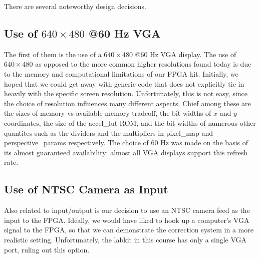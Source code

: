 \documentclass{article}
\begin{document}
There are several noteworthy design decisions.

\subsection{Use of $640 \times 480$ @60 Hz VGA}
The first of them is the use of a $640 \times 480$ @60 Hz VGA display.
The use of $640 \times 480$  as opposed to the more common higher resolutions found today is due to the memory and computational limitations of our FPGA kit.
Initially, we hoped that we could get away with generic code that does not explicitly tie in heavily with the specific screen resolution.
Unfortunately, this is not easy, since the choice of resolution influences many different aspects.
Chief among these are the sizes of memory vs available memory tradeoff, the bit widths of $x$ and $y$ coordinates, the size of the accel\_lut ROM,
and the bit widths of numerous other quantites such as the dividers and the multipliers in pixel\_map and perspective\_params respectively.
The choice of 60 Hz was made on the basis of its almost guaranteed availability: almost all VGA displays support this refresh rate.

\subsection{Use of NTSC Camera as Input}
Also related to input/output is our decision to use an NTSC camera feed as the input to the FPGA.
Ideally, we would have liked to hook up a computer's VGA signal to the FPGA, so that we can demonstrate the correction system in a more realistic setting.
Unfortunately, the labkit in this course has only a single VGA port, ruling out this option.
\end{document}
